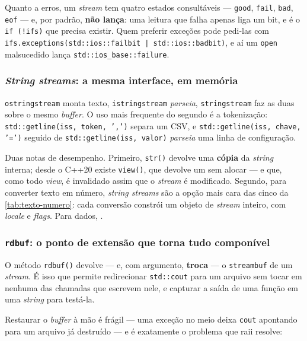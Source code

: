 Quanto a erros, um \emph{stream} tem quatro estados consultáveis ---
\texttt{good}, \texttt{fail}, \texttt{bad}, \texttt{eof} --- e, por padrão,
\textbf{não lança}: uma leitura que falha apenas liga um bit, e é o
\texttt{if (!ifs)} que precisa existir. Quem preferir exceções pode pedi-las com
\texttt{ifs.exceptions(std::ios::failbit | std::ios::badbit)}, e aí um
\texttt{open} malsucedido lança \texttt{std::ios\_base::failure}.

\subsubsection{\emph{String streams}: a mesma interface, em memória}

\texttt{ostringstream} monta texto, \texttt{istringstream} \emph{parseia},
\texttt{stringstream} faz as duas sobre o mesmo \emph{buffer}. O uso mais
frequente do segundo é a tokenização: \texttt{std::getline(iss, token, ',')}
separa um CSV, e \texttt{std::getline(iss, chave, '=')} seguido de
\texttt{std::getline(iss, valor)} \emph{parseia} uma linha de configuração.

Duas notas de desempenho. Primeiro, \texttt{str()} devolve uma \textbf{cópia} da
\emph{string} interna; desde o C++20 existe \texttt{view()}, que devolve um
 sem alocar --- e que, como todo \emph{view}, é
invalidado assim que o \emph{stream} é modificado. Segundo, para converter texto
em número, \emph{string streams} são a opção mais cara das cinco da
\cref{tab:texto-numero}: cada conversão constrói um objeto de \emph{stream}
inteiro, com \emph{locale} e \emph{flags}. Para dados, .

\subsubsection{\texttt{rdbuf}: o ponto de extensão que torna tudo componível}

O método \texttt{rdbuf()} devolve --- e, com argumento, \textbf{troca} --- o
\texttt{streambuf} de um \emph{stream}. É isso que permite redirecionar
\texttt{std::cout} para um arquivo sem tocar em nenhuma das chamadas que
escrevem nele, e capturar a saída de uma função em uma \emph{string} para
testá-la.

Restaurar o \emph{buffer} à mão é frágil --- uma exceção no meio deixa
\texttt{cout} apontando para um arquivo já destruído --- e é exatamente o
problema que \gls{raii} resolve:

